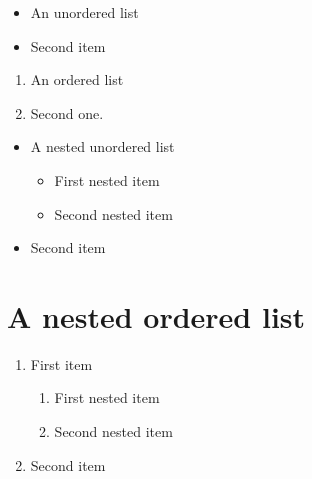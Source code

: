 \documentclass{article}
\begin{document}
  \begin{itemize}
    \item An unordered list
    \item Second item
  \end{itemize}

  \begin{enumerate}
    \item An ordered list
    \item Second one.
  \end{enumerate}

  \begin{itemize}
    \item A nested unordered list
    \begin{itemize}
      \item First nested item
      \item Second nested item
    \end{itemize}
    \item Second item
  \end{itemize}

  \section{A nested ordered list}
  \begin{enumerate}
    \item First item
    \begin{enumerate}
      \item First nested item
      \item Second nested item
    \end{enumerate}
    \item Second item
  \end{enumerate}
\end{document}
